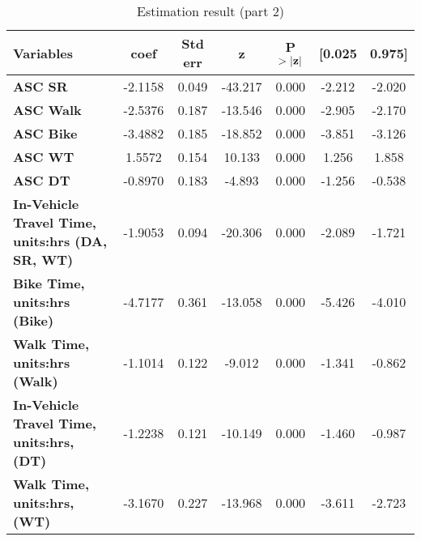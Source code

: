 \documentclass[11pt]{article}
\begin{document}
\begin{table}[H]
\centering
\caption{\label{tb:1.2}Estimation result (part 2)}
\vspace{5pt}
\begin{tabular}{|>{\raggedleft}m{6cm}|c|c|c|c|c|c|}      
\hline                                                
\textbf{Variables} & \textbf{coef} & \textbf{Std err} & \textbf{z} & \textbf{P} $\bf{>|z|}$ & \textbf{[0.025}  & \textbf{0.975]} \\\hline
\textbf{ASC SR}                                         &      -2.1158  &        0.049     &   -43.217  &         0.000        &       -2.212    &       -2.020     \\\hline 
\textbf{ASC Walk}                                       &      -2.5376  &        0.187     &   -13.546  &         0.000        &       -2.905    &       -2.170     \\\hline 
\textbf{ASC Bike}                                       &      -3.4882  &        0.185     &   -18.852  &         0.000        &       -3.851    &       -3.126     \\\hline 
\textbf{ASC WT}                                         &       1.5572  &        0.154     &    10.133  &         0.000        &        1.256    &        1.858     \\\hline 
\textbf{ASC DT}                                         &      -0.8970  &        0.183     &    -4.893  &         0.000        &       -1.256    &       -0.538     \\\hline 
\textbf{In-Vehicle Travel Time, units:hrs (DA, SR, WT)} &      -1.9053  &        0.094     &   -20.306  &         0.000        &       -2.089    &       -1.721     \\\hline 
\textbf{Bike Time, units:hrs (Bike)}                    &      -4.7177  &        0.361     &   -13.058  &         0.000        &       -5.426    &       -4.010     \\\hline 
\textbf{Walk Time, units:hrs (Walk)}                    &      -1.1014  &        0.122     &    -9.012  &         0.000        &       -1.341    &       -0.862     \\\hline 
\textbf{In-Vehicle Travel Time, \\units:hrs, (DT)}        &      -1.2238  &        0.121     &   -10.149  &         0.000        &       -1.460    &       -0.987     \\\hline 
\textbf{Walk Time, units:hrs, (WT)}                     &      -3.1670  &        0.227     &   -13.968  &         0.000        &       -3.611    &       -2.723     \\\hline 

\end{tabular}
\end{table}
\end{document}
